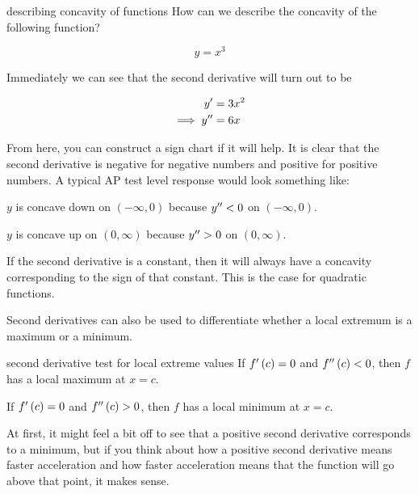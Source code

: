 \begin{example}{describing concavity of functions}
    How can we describe the concavity of the following function?
    
    \[ y = x^3 \]
    
    \vspace{0.3cm}
    
    Immediately we can see that the second derivative will turn out to be
    
    \begin{align}
        y^\prime &= 3x^2 \\
        \implies y^{\prime\prime} &= 6x
    \end{align}
    
    From here, you can construct a sign chart if it will help. It is clear that the second derivative is negative for negative numbers and positive for positive numbers. A typical AP test level response would look something like:
    
    \begin{center}
        \( y \) is concave down on \( \left( -\infty, 0 \right) \) because \( y^{\prime\prime} < 0 \) on \( \left( -\infty, 0 \right) \).
        
        \( y \) is concave up on \( \left( 0, \infty \right) \) because \( y^{\prime\prime} > 0 \) on \( \left( 0, \infty \right) \).
    \end{center}
\end{example}

If the second derivative is a constant, then it will always have a concavity corresponding to the sign of that constant. This is the case for quadratic functions.

Second derivatives can also be used to differentiate whether a local extremum is a maximum or a minimum.

\begin{definition}{second derivative test for local extreme values}
    If \( f^\prime \left( c \right) = 0 \) and \( f^{\prime\prime} \left( c \right) < 0 \), then \( f \) has a local maximum at \( x = c \).
    
    If \( f^\prime \left( c \right) = 0 \) and \( f^{\prime\prime} \left( c \right) > 0 \), then \( f \) has a local minimum at \( x = c \).
\end{definition}

At first, it might feel a bit off to see that a positive second derivative corresponds to a minimum, but if you think about how a positive second derivative means faster acceleration and how faster acceleration means that the function will go above that point, it makes sense.

